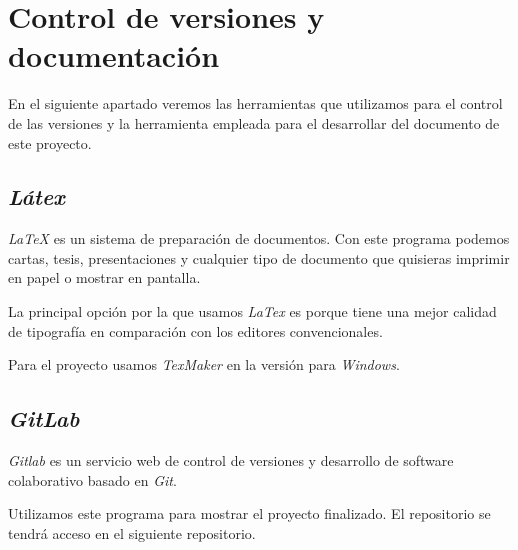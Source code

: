 \section{Control de versiones y documentación}

En el siguiente apartado veremos las herramientas que utilizamos para el control de las versiones y la herramienta empleada para el desarrollar del documento de este proyecto.

\subsection{\textit{Látex}}

\textit{LaTeX}\cite{latex} es un sistema de preparación de documentos. Con este programa podemos cartas, tesis, presentaciones y cualquier tipo de documento que quisieras imprimir en papel o mostrar en pantalla. 

La principal opción por la que usamos \textit{LaTex} es porque tiene una mejor calidad de tipografía en comparación con los editores convencionales.

Para el proyecto usamos \textit{TexMaker} en la versión para \textit{Windows}.

\subsection{\textit{GitLab}}

\textit{Gitlab}\cite{gitlab} es un servicio web de control de versiones y desarrollo de software colaborativo basado en \textit{Git}.

Utilizamos este programa para mostrar el proyecto finalizado. El repositorio se tendrá acceso en el siguiente repositorio. \cite{repositorio}


